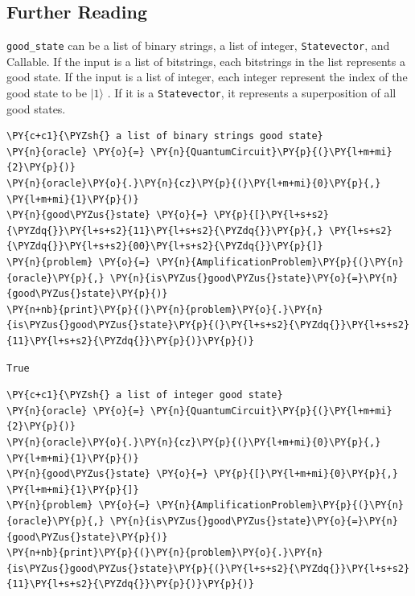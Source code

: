     \hypertarget{further-reading}{%
\subsection*{Further Reading}\label{further-reading}}

\texttt{good\_state} can be a list of binary strings, a list of integer,
\texttt{Statevector}, and Callable. If the input is a list of
bitstrings, each bitstrings in the list represents a good state. If the
input is a list of integer, each integer represent the index of the good
state to be \(|1\rangle\) . If it is a \texttt{Statevector}, it
represents a superposition of all good states.

    \begin{tcolorbox}[breakable, size=fbox, boxrule=1pt, pad at break*=1mm,colback=cellbackground, colframe=cellborder]
\begin{Verbatim}[commandchars=\\\{\}]
\PY{c+c1}{\PYZsh{} a list of binary strings good state}
\PY{n}{oracle} \PY{o}{=} \PY{n}{QuantumCircuit}\PY{p}{(}\PY{l+m+mi}{2}\PY{p}{)}
\PY{n}{oracle}\PY{o}{.}\PY{n}{cz}\PY{p}{(}\PY{l+m+mi}{0}\PY{p}{,} \PY{l+m+mi}{1}\PY{p}{)}
\PY{n}{good\PYZus{}state} \PY{o}{=} \PY{p}{[}\PY{l+s+s2}{\PYZdq{}}\PY{l+s+s2}{11}\PY{l+s+s2}{\PYZdq{}}\PY{p}{,} \PY{l+s+s2}{\PYZdq{}}\PY{l+s+s2}{00}\PY{l+s+s2}{\PYZdq{}}\PY{p}{]}
\PY{n}{problem} \PY{o}{=} \PY{n}{AmplificationProblem}\PY{p}{(}\PY{n}{oracle}\PY{p}{,} \PY{n}{is\PYZus{}good\PYZus{}state}\PY{o}{=}\PY{n}{good\PYZus{}state}\PY{p}{)}
\PY{n+nb}{print}\PY{p}{(}\PY{n}{problem}\PY{o}{.}\PY{n}{is\PYZus{}good\PYZus{}state}\PY{p}{(}\PY{l+s+s2}{\PYZdq{}}\PY{l+s+s2}{11}\PY{l+s+s2}{\PYZdq{}}\PY{p}{)}\PY{p}{)}
\end{Verbatim}
\end{tcolorbox}

    \begin{Verbatim}[commandchars=\\\{\}]
True
    \end{Verbatim}

    \begin{tcolorbox}[breakable, size=fbox, boxrule=1pt, pad at break*=1mm,colback=cellbackground, colframe=cellborder]
\begin{Verbatim}[commandchars=\\\{\}]
\PY{c+c1}{\PYZsh{} a list of integer good state}
\PY{n}{oracle} \PY{o}{=} \PY{n}{QuantumCircuit}\PY{p}{(}\PY{l+m+mi}{2}\PY{p}{)}
\PY{n}{oracle}\PY{o}{.}\PY{n}{cz}\PY{p}{(}\PY{l+m+mi}{0}\PY{p}{,} \PY{l+m+mi}{1}\PY{p}{)}
\PY{n}{good\PYZus{}state} \PY{o}{=} \PY{p}{[}\PY{l+m+mi}{0}\PY{p}{,} \PY{l+m+mi}{1}\PY{p}{]}
\PY{n}{problem} \PY{o}{=} \PY{n}{AmplificationProblem}\PY{p}{(}\PY{n}{oracle}\PY{p}{,} \PY{n}{is\PYZus{}good\PYZus{}state}\PY{o}{=}\PY{n}{good\PYZus{}state}\PY{p}{)}
\PY{n+nb}{print}\PY{p}{(}\PY{n}{problem}\PY{o}{.}\PY{n}{is\PYZus{}good\PYZus{}state}\PY{p}{(}\PY{l+s+s2}{\PYZdq{}}\PY{l+s+s2}{11}\PY{l+s+s2}{\PYZdq{}}\PY{p}{)}\PY{p}{)}
\end{Verbatim}
\end{tcolorbox}

